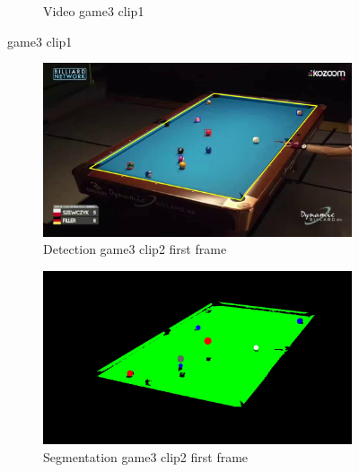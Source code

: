 \begin{figure}[H]
\begin{subfigure}[b]{0.48\textwidth}
    	\caption{Video game3 clip1}
    	\label{fig: game3_clip1_video}
    \end{subfigure}

	\caption{game3 clip1}
\end{figure}

\begin{figure}[H]
    \centering
    \begin{subfigure}[b]{0.48\textwidth}
        \centering
        \includegraphics[width=\textwidth]{images/Detection/game3_clip2_detected_balls_first_frame.jpg}
        \caption{Detection game3 clip2 first frame}
        \label{fig: game3_clip2_first_frame_detected}
    \end{subfigure}
    \begin{subfigure}[b]{0.48\textwidth}
        \centering
        \includegraphics[width=\textwidth]{images/Segmentation/game3_clip2_segmented_balls_first_frame.jpg}
        \caption{Segmentation game3 clip2 first frame}
		\label{fig: game3_clip2_first_frame_segmented}
    \end{subfigure}
    \begin{subfigure}[b]{0.48\textwidth}

\end{subfigure}
\end{figure}
